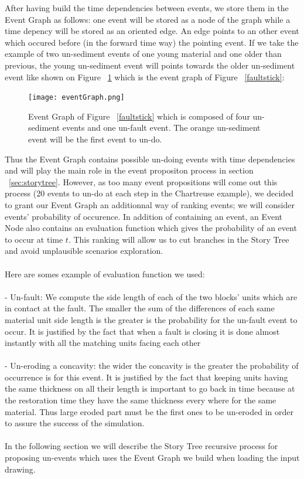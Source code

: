 \documentclass[12pt, a4paper]{report} %
\begin{document}
After having build the time dependencies between events, we store them in the Event Graph as follows:
one event will be stored as a node of the graph while a time depency will be stored as an oriented edge. An edge points to an other event which occured before (in the forward time way) the pointing event. If we take the example of two un-sediment events of one young material and one older than previous, the young un-sediment event will points towards the older un-sediment event like shown on Figure ~\ref{eventGraph} which is the event graph of Figure ~\ref{faultstick}:

	\begin{figure}[H]
	\centering
	\texttt{[image: eventGraph.png]}
	\caption{ Event Graph of Figure ~\ref{faultstick} which is composed of four un-sediment events and one un-fault event. The orange un-sediment event will be the first event to un-do.}
	\label{eventGraph}
	\end{figure}

Thus the Event Graph contains possible un-doing events with time dependencies and will play the main role in the event propositon process in section ~\ref{sec:storytree}. However, as too many event propositions will come out this process (20 events to un-do at each step in the Chartreuse example), we decided to grant our Event Graph an additionnal way of ranking events; we will consider events' probability of occurence. In addition of containing an event, an Event Node also contains an evaluation function which gives the probability of an event to occur at time $t$. This ranking will allow us to cut branches in the Story Tree and avoid unplausible scenarios exploration.
\\\\
Here are somes example of evaluation function we used:
\\\\
 - Un-fault: We compute the side length of each of the two blocks' units which are in contact at the fault. The smaller the sum of the differences of each same material unit side length is the greater is the probability for the un-fault event to occur. It is justified by the fact that when a fault is closing it is done almost instantly with all the matching units facing each other\\\\
 
 - Un-eroding a concavity: the wider the concavity is the greater the probability of occurrence is for this event. It is justified by the fact that keeping units having the same thickness on all their length is important to go back in time because at the restoration time they have the same thickness every where for the same material. Thus large eroded part must be the first ones to be un-eroded in order to assure the success of the simulation.\\\\
In the following section we will describe the Story Tree recursive process for proposing un-events which uses the Event Graph we build when loading the input drawing.
\end{document}
